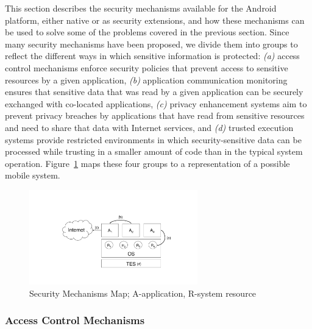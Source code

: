 This section describes the security mechanisms available for the Android platform, either native or as security extensions, and how these mechanisms can be used to solve some of the problems covered in the previous section. Since many security mechanisms have been proposed, we divide them into groups to reflect the different ways in which sensitive information is protected: \emph{(a)} access control mechanisms enforce security policies that prevent access to sensitive resources by a given application, \emph{(b)} application communication monitoring ensures that sensitive data that was read by a given application can be securely exchanged with co-located applications, \emph{(c)} privacy enhancement systems aim to prevent privacy breaches by applications that have read from sensitive resources and need to share that data with Internet services, and \emph{(d)} trusted execution systems provide restricted environments in which security-sensitive data can be processed while trusting in a smaller amount of code than in the typical system operation. Figure~\ref{fig:relwork} maps these four groups to a representation of a possible mobile system.


\begin{figure}[t!]
	\centering
	\includegraphics[width=0.65\textwidth]{img/relwork.pdf}
	\caption{Security Mechanisms Map; A-application, R-system resource}
	\label{fig:relwork}
\end{figure}

\subsubsection{Access Control Mechanisms}


